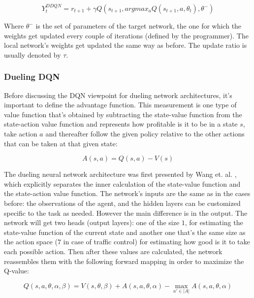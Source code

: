 \documentclass[
]{elteikthesis}[2023/04/10]
\begin{document}
\begin{equation}
Y_{t}^{DDQN}=r_{t+1}+\gamma Q\left(s_{t+1},argmax_{a}Q\left(s_{t+1},a,\theta_{t}\right),\theta^{-}\right)
\end{equation}

Where $\theta^{-}$ is the set of parameters of the target network,
the one for which the weights get updated every couple of iterations
(defined by the programmer). The local network's weights get updated
the same way as before. The update ratio is usually denoted by $\tau$.

\subsubsection*{Dueling DQN}

Before discussing the DQN viewpoint for dueling network architectures,
it's important to define the advantage function. This measurement
is one type of value function that's obtained by subtracting the state-value
function from the state-action value function and represents how profitable
is it to be in a state $s$, take action $a$ and thereafter follow
the given policy relative to the other actions that can be taken at
that given state:

\begin{equation}
A(s,a)=Q\left(s,a\right)-V\left(s\right)
\end{equation}

The dueling neural network architecture was first presented by Wang
et. al. \cite{wang2016dueling}, which explicitly separates the inner
calculation of the state-value function and the state-action value
function. The network's inputs are the same as in the cases before:
the observations of the agent, and the hidden layers can be customized
specific to the task as needed. However the main difference is in
the output. The network will get two heads (output layers): one of
the size $1$, for estimating the state-value function of the current
state and another one that's the same size as the action space ($7$
in case of traffic control) for estimating how good is it to take
each possible action. Then after these values are calculated, the
network reassembles them with the following forward mapping in order
to maximize the Q-value:

\begin{equation}
Q\left(s,a,\theta,\alpha,\beta\right)=V\left(s,\theta,\beta\right)+A\left(s,a,\theta,\alpha\right)-\max_{a'\in\left|A\right|}A\left(s,a,\theta,\alpha\right)
\end{equation}
\end{document}
